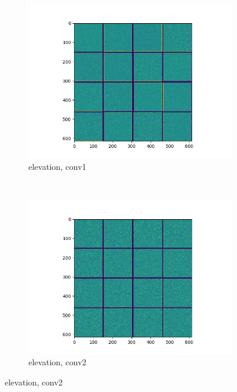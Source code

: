 \documentclass[11pt,a4paper]{article}
\begin{document}
\begin{figure}[t]
    \centering
    \begin{subfigure}[b]{0.4\textwidth}
        \includegraphics[width=\textwidth]{graphics/nn_visualisation/convnet_filters_elevation_conv2d.png}
        \caption{elevation, conv1}
    \end{subfigure}
    ~
    \begin{subfigure}[b]{0.4\textwidth}
        \includegraphics[width=\textwidth]{graphics/nn_visualisation/convnet_filters_elevation_conv2d_1.png}
        \caption{elevation, conv2}
    \end{subfigure}


\end{figure}
\end{document}
